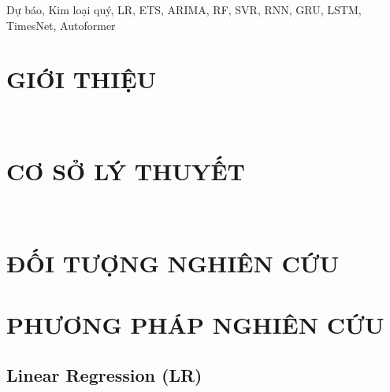 \documentclass[conference]{IEEEtran}
\begin{document}
\maketitle
\thispagestyle{fancy}
\begin{abstract}

\end{abstract}

\begin{IEEEkeywords}
Dự báo, Kim loại quý, LR, ETS, ARIMA, RF, SVR, RNN, GRU, LSTM, TimesNet, Autoformer
\end{IEEEkeywords}

\section{GIỚI THIỆU}
\\

\section{CƠ SỞ LÝ THUYẾT}


















\\

\section{ĐỐI TƯỢNG NGHIÊN CỨU}

\hfill
\section{PHƯƠNG PHÁP NGHIÊN CỨU}
\subsection{Linear Regression (LR)}

\end{document}
